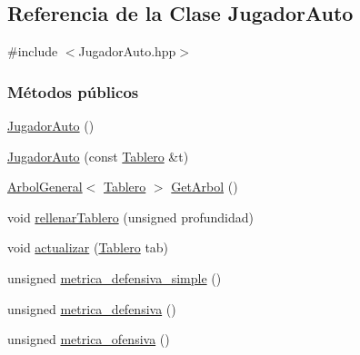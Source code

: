 \hypertarget{classJugadorAuto}{\subsection{Referencia de la Clase Jugador\-Auto}
\label{classJugadorAuto}
}


{\ttfamily \#include $<$Jugador\-Auto.\-hpp$>$}

\subsubsection*{Métodos públicos}
\begin{DoxyCompactItemize}
\item 
\hyperlink{classJugadorAuto_a28f4b4c52165488379729d71237a41a9}{Jugador\-Auto} ()
\item 
\hyperlink{classJugadorAuto_a0c2bc2690a8e6ba93b05a83b9310a03e}{Jugador\-Auto} (const \hyperlink{classTablero}{Tablero} \&t)
\item 
\hyperlink{classArbolGeneral}{Arbol\-General}$<$ \hyperlink{classTablero}{Tablero} $>$ \hyperlink{classJugadorAuto_a74531aa932becde453fe8667f6455413}{Get\-Arbol} ()
\item 
void \hyperlink{classJugadorAuto_a037135d5bad9b9ce107f3d1aeb63b1df}{rellenar\-Tablero} (unsigned profundidad)
\item 
void \hyperlink{classJugadorAuto_ac1c2056f753f8f09d2acf9a72e822fb2}{actualizar} (\hyperlink{classTablero}{Tablero} tab)
\item 
unsigned \hyperlink{classJugadorAuto_ab73b8f7888e024b14391fc5392597fdd}{metrica\-\_\-defensiva\-\_\-simple} ()
\item 
unsigned \hyperlink{classJugadorAuto_aa2b7fd12be957eaf93c4ca53a452c66b}{metrica\-\_\-defensiva} ()
\item 
unsigned \hyperlink{classJugadorAuto_a0a49b8f33fafc9ef328c781472f3017a}{metrica\-\_\-ofensiva} ()
\end{DoxyCompactItemize}
